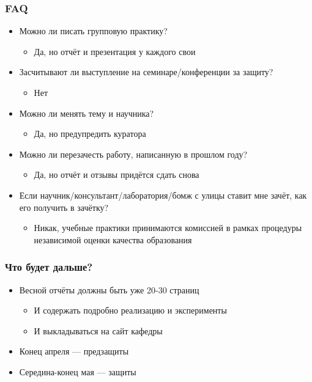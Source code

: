 \documentclass[xetex,mathserif,serif]{beamer}
\begin{document}
    \begin{frame}
        \frametitle{FAQ}
        \begin{itemize}
            \item Можно ли писать групповую практику?
            \begin{itemize}
                \item Да, но отчёт и презентация у каждого свои
            \end{itemize}
            \item Засчитывают ли выступление на семинаре/конференции за защиту?
            \begin{itemize}
                \item Нет
            \end{itemize}
            \item Можно ли менять тему и научника?
            \begin{itemize}
                \item Да, но предупредить куратора
            \end{itemize}
            \item Можно ли перезачесть работу, написанную в прошлом году?
            \begin{itemize}
                \item Да, но отчёт и отзывы придётся сдать снова
            \end{itemize}
            \item Если научник/консультант/лаборатория/бомж с улицы ставит мне зачёт, как его получить в зачётку?
            \begin{itemize}
                \item Никак, учебные практики принимаются комиссией в рамках процедуры независимой оценки качества образования
            \end{itemize}
        \end{itemize}
    \end{frame}

    \begin{frame}
        \frametitle{Что будет дальше?}
        \begin{itemize}
            \item Весной отчёты должны быть уже 20-30 страниц
            \begin{itemize}
                \item И содержать подробно реализацию и эксперименты
                \item И выкладываться на сайт кафедры
            \end{itemize}
            \item Конец апреля --- предзащиты
            \item Середина-конец мая --- защиты
        \end{itemize}
    \end{frame}
\end{document}
